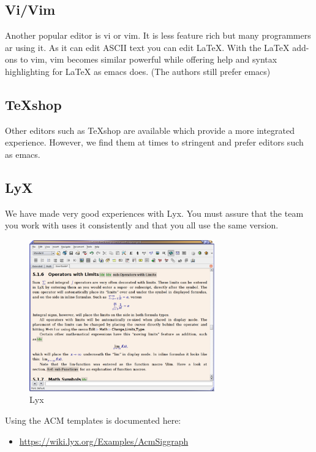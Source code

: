 \subsection{Vi/Vim}\label{vivim}

Another popular editor is vi or vim. It is less feature rich but many
programmers ar using it. As it can edit ASCII text you can edit LaTeX.
With the LaTeX add-ons to vim, vim becomes similar powerful while
offering help and syntax highlighting for LaTeX as emacs does. (The
authors still prefer emacs)

\subsection{TeXshop}\label{texshop}

Other editors such as TeXshop are available which provide a more
integrated experience. However, we find them at times to stringent and
prefer editors such as emacs.

\subsection{LyX}\label{lyx}

We have made very good experiences with Lyx. You must assure that the
team you work with uses it consistently and that you all use the same
version.

\begin{figure}[!htb]
  \centering\includegraphics[width=8cm]{images/lyx.png}
  \caption{Lyx}
  \label{F:lyx}
\end{figure}

Using the ACM templates is documented here:

\begin{itemize}

\item
  \url{https://wiki.lyx.org/Examples/AcmSiggraph}
\end{itemize}

